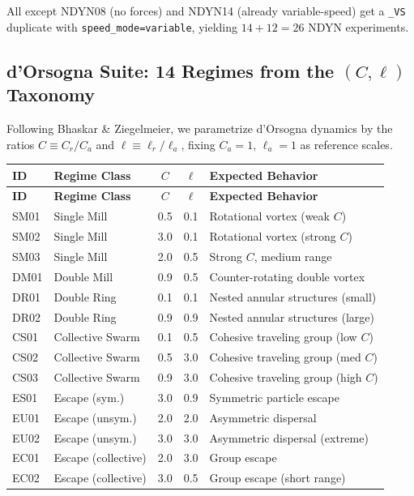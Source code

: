 \documentclass[11pt]{article}
\begin{document}
All except NDYN08 (no forces) and NDYN14 (already variable-speed)
get a \texttt{\_VS} duplicate with \texttt{speed\_mode=variable},
yielding $14 + 12 = 26$ NDYN experiments.

\subsection{d'Orsogna Suite: 14 Regimes from the $(C,\ell)$ Taxonomy}

Following Bhaskar \& Ziegelmeier, we parametrize d'Orsogna dynamics by
the ratios $C \equiv C_r/C_a$ and $\ell \equiv \ell_r/\ell_a$, fixing
$C_a=1$, $\ell_a=1$ as reference scales.

\begin{longtable}{llccp{5.5cm}}
    \toprule
    \textbf{ID} & \textbf{Regime Class} & $C$ & $\ell$ & \textbf{Expected Behavior} \\
    \midrule
    \endfirsthead
    \toprule
    \textbf{ID} & \textbf{Regime Class} & $C$ & $\ell$ & \textbf{Expected Behavior} \\
    \midrule
    \endhead

    SM01 & Single Mill        & 0.5 & 0.1 & Rotational vortex (weak $C$) \\
    SM02 & Single Mill        & 3.0 & 0.1 & Rotational vortex (strong $C$) \\
    SM03 & Single Mill        & 2.0 & 0.5 & Strong $C$, medium range \\
    DM01 & Double Mill        & 0.9 & 0.5 & Counter-rotating double vortex \\
    DR01 & Double Ring        & 0.1 & 0.1 & Nested annular structures (small) \\
    DR02 & Double Ring        & 0.9 & 0.9 & Nested annular structures (large) \\
    CS01 & Collective Swarm   & 0.1 & 0.5 & Cohesive traveling group (low $C$) \\
    CS02 & Collective Swarm   & 0.5 & 3.0 & Cohesive traveling group (med $C$) \\
    CS03 & Collective Swarm   & 0.9 & 3.0 & Cohesive traveling group (high $C$) \\
    ES01 & Escape (sym.)      & 3.0 & 0.9 & Symmetric particle escape \\
    EU01 & Escape (unsym.)    & 2.0 & 2.0 & Asymmetric dispersal \\
    EU02 & Escape (unsym.)    & 3.0 & 3.0 & Asymmetric dispersal (extreme) \\
    EC01 & Escape (collective) & 2.0 & 3.0 & Group escape \\
    EC02 & Escape (collective) & 3.0 & 0.5 & Group escape (short range) \\
    \bottomrule
\end{longtable}
\end{document}
